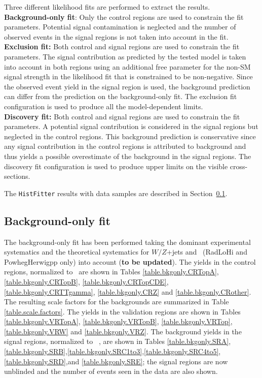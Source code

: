 Three different likelihood fits are performed to extract the results. \\
{\bf Background-only fit}: Only the control regions are used to constrain
the fit parameters. Potential signal contamination is neglected and
the number of observed events in the signal regions is not taken into
account in the fit. \\
{\bf Exclusion fit:} Both control and signal regions are used to
constrain the fit parameters. The signal contribution as predicted by
the tested model is taken into account in both regions using an
additional free parameter for the non-SM signal strength in the
likelihood fit that is constrained to be non-negative. Since the
observed event yield in the signal region is used, the background
prediction can differ from the prediction on the background-only fit. The exclusion fit configuration is used to produce all the model-dependent limits.\\
{\bf Discovery fit:} Both control and signal regions are used to constrain the fit parameters. A potential signal contribution is considered in the signal regions but neglected in the control regions. This background prediction is conservative since any signal contribution in the control regions is attributed to background and thus yields a possible overestimate of the background in the signal regions. The discovery fit configuration is used to produce upper limits on the visible cross-sections.

The \verb+HistFitter+
results with data samples are
described in
Section~\ref{sec:bkgOnlyFit}. 

\clearpage




\clearpage
\subsection{Background-only fit}
\label{sec:bkgOnlyFit}
The background-only fit 
has been performed taking the dominant experimental systematics and
the theoretical systematics for $W/Z$+jets and \ttbar~(RadLoHi and PowhegHerwigpp only) 
into account ({\bf to be updated}).
The yields in the control regions, normalized to \intlumi\ \ifb are shown
in Tables \ref{table.bkgonly.CRTopA}, \ref{table.bkgonly.CRTopB},
\ref{table.bkgonly.CRTopCDE}, \ref{table.bkgonly.CRTTgamma},
\ref{table.bkgonly.CRZ} and \ref{table.bkgonly.CRother}. 
The resulting scale factors for the backgrounds are summarized in Table
\ref{table.scale.factors}. The yields in the validation regions
are shown in Tables \ref{table.bkgonly.VRTopA},
\ref{table.bkgonly.VRTopB}, \ref{table.bkgonly.VRTop},
\ref{table.bkgonly.VRW}
and \ref{table.bkgonly.VRZ}.
The background yields in the signal regions, normalized to
\intlumi\ \ifb, are shown in Tables
\ref{table.bkgonly.SRA},\ref{table.bkgonly.SRB},\ref{table.bkgonly.SRC1to3},\ref{table.bkgonly.SRC4to5},\ref{table.bkgonly.SRD},and
\ref{table.bkgonly.SRE}; the signal regions are now unblinded and the
number of events seen in the data are also shown.

